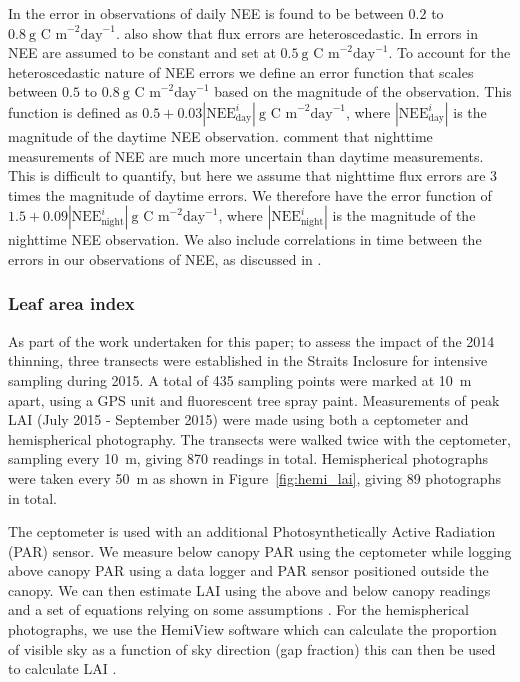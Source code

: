 \documentclass[12pt]{article}
\begin{document}
In \citet{Richardson200838} the error in observations of daily NEE is found to be between $0.2$ to $0.8~\text{g C m}^{-2} \text{day}^{-1}$.  \citet{Richardson200838} also show that flux errors are heteroscedastic. In \citet{williams2005improved} errors in NEE are assumed to be constant and set at $0.5~\text{g C m}^{-2} \text{day}^{-1}$. To account for the heteroscedastic nature of NEE errors we define an error function that scales between $0.5$ to $0.8~\text{g C m}^{-2} \text{day}^{-1}$ based on the magnitude of the observation. This function is defined as $0.5 + 0.03|\text{NEE}_{\text{day}}^{i}|~\text{g C m}^{-2} \text{day}^{-1}$, where \(|\text{NEE}_{\text{day}}^{i}|\) is the magnitude of the daytime NEE observation. \citet{raupach2005model} comment that nighttime measurements of NEE are much more uncertain than daytime measurements. This is difficult to quantify, but here we assume that nighttime flux errors are 3 times the magnitude of daytime errors. We therefore have the error function of $1.5 + 0.09|\text{NEE}_{\text{night}}^{i}|~\text{g C m}^{-2} \text{day}^{-1}$, where \(|\text{NEE}_{\text{night}}^{i}|\) is the magnitude of the nighttime NEE observation. We also include correlations in time between the errors in our observations of NEE, as discussed in \citet{Pinnington2016299}.

\subsubsection{Leaf area index}

As part of the work undertaken for this paper; to assess the impact of the 2014 thinning, three transects were established in the Straits Inclosure for intensive sampling during 2015. A total of 435 sampling points were marked at 10~m apart, using a GPS unit and fluorescent tree spray paint. Measurements of peak LAI (July 2015 - September 2015) were made using both a ceptometer and hemispherical photography. The transects were walked twice with the ceptometer, sampling every 10~m, giving 870 readings in total. Hemispherical photographs were taken every 50~m as shown in Figure~\ref{fig:hemi_lai}, giving 89 photographs in total. 

The ceptometer is used with an additional Photosynthetically Active Radiation (PAR) sensor. We measure below canopy PAR using the ceptometer while logging above canopy PAR using a data logger and PAR sensor positioned outside the canopy. We can then estimate LAI using the above and below canopy readings and a set of equations relying on some assumptions \citep{fassnacht1994comparison}.
For the hemispherical photographs, we use the HemiView software \citep{rich1999hemiview} which can calculate the proportion of visible sky as a function of sky direction (gap fraction) this can then be used to calculate LAI  \citep{Jonckheere2004}.
\end{document}
